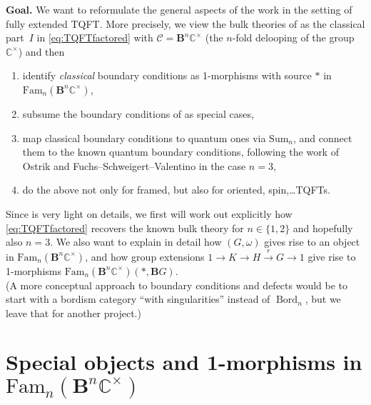 \documentclass[12pt]{scrartcl}
\newcommand{\Ccal}{\mathcal C}
\newcommand{\boldB}{\boldsymbol{B}}
\newcommand{\C}{\mathds{C}}
\newcommand{\Bord}{\operatorname{Bord}}
\theoremstyle{definition}
\numberwithin{equation}{section}
\numberwithin{definition}{section}
\numberwithin{figure}{section}
\begin{document}
\noindent
\textbf{Goal. }
We want to reformulate the general aspects of the work \cite{WittenParity2016, WWW} in the setting of fully extended TQFT. 
More precisely, we view the bulk theories of \cite{WittenParity2016, WWW} as the classical part~$I$ in \eqref{eq:TQFTfactored} with $\Ccal = \boldB^n \C^\times$ (the $n$-fold delooping of the group~$\C^\times$) and then 
\begin{enumerate}
\item
identify \textsl{classical} boundary conditions as 1-morphisms with source $*$ in $\textrm{Fam}_n(\boldB^n \C^\times)$, 
\item
subsume the boundary conditions of \cite{WittenParity2016, WWW} as special cases, 
\item
map classical boundary conditions to quantum ones via $\textrm{Sum}_n$, and connect them to the known quantum boundary conditions, following the work of Ostrik and Fuchs--Schweigert--Valentino in the case $n=3$, 
\item 
do the above not only for framed, but also for oriented, spin,\dots TQFTs. 
\end{enumerate}

\medskip

Since \cite{FHLT} is very light on details, we first will work out explicitly how \eqref{eq:TQFTfactored} recovers the known bulk theory for $n \in \{1,2\}$ and hopefully also $n=3$. 
We also want to explain in detail how $(G,\omega)$ gives rise to an object in $\textrm{Fam}_n(\boldB^n \C^\times)$, and how group extensions $1 \to K \to H \stackrel{r}{\to} G \to 1$ give rise to 1-morphisms $\textrm{Fam}_n(\boldB^n \C^\times)(*, \boldB G)$. 
\\
(A more conceptual approach to boundary conditions and defects would be to start with a bordism category ``with singularities'' \cite[Sect.\,4.3]{l0905.0465} instead of $\Bord_n$, but we leave that for another project.)


\section{Special objects and 1-morphisms in $\textrm{Fam}_n(\boldB^n \C^\times)$}
\label{sec:FamBnC}
\end{document}
